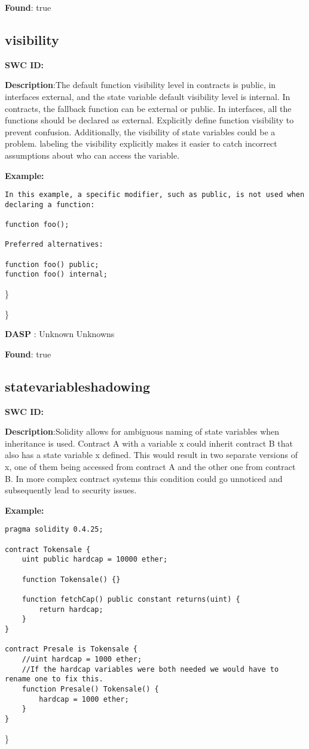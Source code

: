 \documentclass{article}
\begin{document}
\textbf{Found}: true

\subsection{visibility} 
\textbf{SWC \textunderscore ID:} 

\textbf{Description}:The default function visibility level in contracts is public, in interfaces \textendash  external,  and the state variable default visibility level is internal. In contracts, the fallback function can be external or public. In interfaces, all the functions should be declared as external. Explicitly define function visibility to prevent confusion.
Additionally, the visibility of state variables could be a problem. labeling the visibility explicitly makes it easier to catch incorrect assumptions about who can access the variable.


\textbf{Example:} 
\begin{verbatim}
In this example, a specific modifier, such as public, is not used when declaring a function:

function foo();

Preferred alternatives:

function foo() public;
function foo() internal;

\end{verbatim}\} 

\} 

\textbf{DASP} : Unknown Unknowns

\textbf{Found}: true

\subsection{state\textunderscore variable\textunderscore shadowing} 
\textbf{SWC \textunderscore ID:} 

\textbf{Description}:Solidity allows for ambiguous naming of state variables when inheritance is used. Contract A with a variable x could inherit contract B that also has a state variable x defined. This would result in two separate versions of x, one of them being accessed from contract A and the other one from contract B. In more complex contract systems this condition could go unnoticed and subsequently lead to security issues.


\textbf{Example:} 
\begin{verbatim}
pragma solidity 0.4.25;

contract Tokensale {
    uint public hardcap = 10000 ether;

    function Tokensale() {}

    function fetchCap() public constant returns(uint) {
        return hardcap;
    }
}

contract Presale is Tokensale {
    //uint hardcap = 1000 ether;
    //If the hardcap variables were both needed we would have to rename one to fix this.
    function Presale() Tokensale() {
        hardcap = 1000 ether;
    }
}

\end{verbatim}\} 
\end{document}
